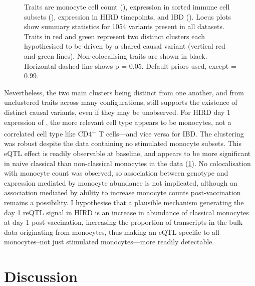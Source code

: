 \begin{figure}
{        Traits are monocyte cell count (\textcite{astle2016AllelicLandscapeHuman}),  expression in sorted immune cell subsets (\textcite{schmiedel2018ImpactGeneticPolymorphisms}),  expression in \gls{HIRD} timepoints, and \gls{IBD} (\textcite{delange2017GenomewideAssociationStudy}).
        Locus plots show summary statistics for 1054 variants present in all datasets.
        Traits in red and green represent two distinct clusters each hypothesised to be driven by a shared causal variant (vertical red and green lines).
        Non-colocalising traits are shown in black.
        Horizontal dashed line shows p = 0.05.
        Default priors used, except  = 0.99.
    }
    \label{fig:hird_reQTL_coloc_ADCY3_locusPlot}
\end{figure}

Nevertheless, the two main clusters being distinct from one another, and from unclustered traits across many configurations,
still supports the existence of distinct causal variants, even if they may be unobserved.
For \gls{HIRD} day 1 expression of , the more relevant cell type appears to be monocytes, not a correlated cell type like CD4\textsuperscript{+} T cells---and vice versa for \gls{IBD}.
The clustering was robust despite the data containing no stimulated monocyte subsets.
This \gls{eQTL} effect is readily observable at baseline, and appears to be more significant in naive classical than non-classical monocytes in the \autocite{schmiedel2018ImpactGeneticPolymorphisms} data (\cref{fig:hird_reQTL_coloc_ADCY3_locusPlot}).
No colocalisation with monocyte count was observed, so association between genotype and  expression mediated by monocyte abundance is not implicated, 
although an association mediated by ability to increase monocyte counts post-vaccination remains a possibility.
I hypothesise that a plausible mechanism generating the day 1 \gls{reQTL} signal in \gls{HIRD}
is an increase in abundance of classical monocytes at day 1 post-vaccination,
increasing the proportion of  transcripts in the bulk data originating from monocytes,
thus making an \gls{eQTL} specific to all monocytes--not just stimulated monocytes---more readily detectable.

\section{Discussion}


